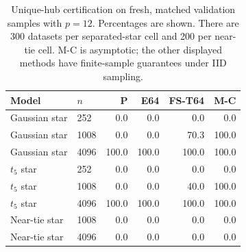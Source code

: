 \begin{table}[htbp]\centering
\caption{Unique-hub certification on fresh, matched validation samples with $p=12$. Percentages are shown. There are 300 datasets per separated-star cell and 200 per near-tie cell. M-C is asymptotic; the other displayed methods have finite-sample guarantees under IID sampling.}\label{tab:new-power}
\begin{tabular}{llrrrr}\toprule Model & $n$ & P & E64 & FS-T64 & M-C\\\midrule
Gaussian star & 252 & 0.0 & 0.0 & 0.0 & 0.0\\
Gaussian star & 1008 & 0.0 & 0.0 & 70.3 & 100.0\\
Gaussian star & 4096 & 100.0 & 100.0 & 100.0 & 100.0\\
$t_5$ star & 252 & 0.0 & 0.0 & 0.0 & 0.0\\
$t_5$ star & 1008 & 0.0 & 0.0 & 40.0 & 100.0\\
$t_5$ star & 4096 & 100.0 & 100.0 & 100.0 & 100.0\\
Near-tie star & 1008 & 0.0 & 0.0 & 0.0 & 0.0\\
Near-tie star & 4096 & 0.0 & 0.0 & 0.0 & 0.0\\
\bottomrule\end{tabular}\end{table}
